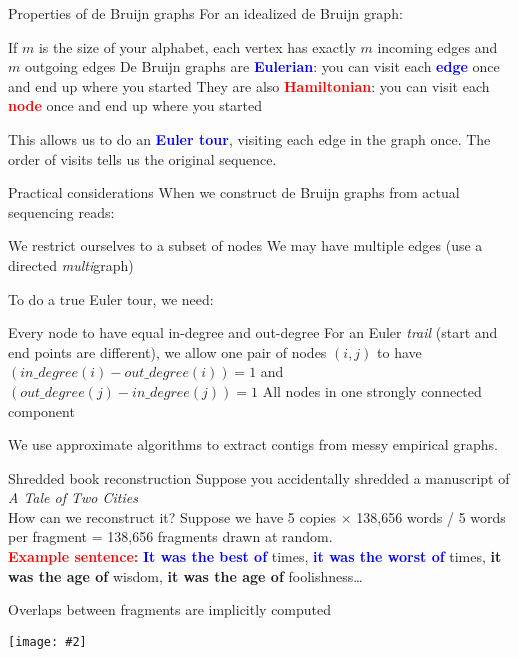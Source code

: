 \documentclass{beamer}
\renewcommand{\c}[1]{\begin{center}#1\end{center}}
\newcommand{\blu}[1]{\textcolor{blue}{\textbf{#1}}}
\newcommand{\red}[1]{\textcolor{red}{\textbf{#1}}}
\newcommand{\grn}[1]{\textcolor{dark-green}{\textbf{#1}}}
\newcommand{\gr}[2][.95]{\c{\texttt{[image: \#2]}}}
\begin{document}
\begin{frame}{Properties of de Bruijn graphs}
For an idealized de Bruijn graph:
    \begin{outline}
        \1 If $m$ is the size of your alphabet, each vertex has exactly $m$ incoming edges and $m$ outgoing edges
        \1 De Bruijn graphs are \blu{Eulerian}: you can visit each \blu{edge} once and end up where you started
        \1 They are also \red{Hamiltonian}: you can visit each \red{node} once and end up where you started
    \end{outline}
    This allows us to do an \blu{Euler tour}, visiting each edge in the graph once. The order of visits tells us the original sequence.
\end{frame}

\begin{frame}{Practical considerations}
When we construct de Bruijn graphs from actual sequencing reads:
\begin{outline}
    \1 We restrict ourselves to a subset of nodes
    \1 We may have multiple edges (use a directed \textit{multi}graph)
\end{outline}
To do a true Euler tour, we need:
\begin{outline}
    \1 Every node to have equal in-degree and out-degree
        \2 For an Euler \textit{trail} (start and end points are different), we allow one pair of nodes $(i, j)$ to have $(in\_degree(i)  - out\_degree(i)) = 1$ and $(out\_degree(j) - in\_degree(j)) = 1$
    \1 All nodes in one strongly connected component
\end{outline}
We use approximate algorithms to extract contigs from messy empirical graphs.
\end{frame}

\begin{frame}{Shredded book reconstruction}
Suppose you accidentally shredded a manuscript of \textit{A Tale of Two Cities}\\
\bigskip
How can we reconstruct it? Suppose we have 5 copies $\times$ 138,656 words / 5 words per fragment = 138,656 fragments drawn at random.\\
\bigskip
\red{Example sentence:} \blu{It was the best of} times, \blu{it was the worst of} times, \grn{it was the age of} wisdom, \grn{it was the age of} foolishness\ldots
\end{frame}

\begin{frame}{Overlaps between fragments are implicitly computed}
\gr{l4_figs/s17_twocities.png}
\end{frame}
\end{document}
